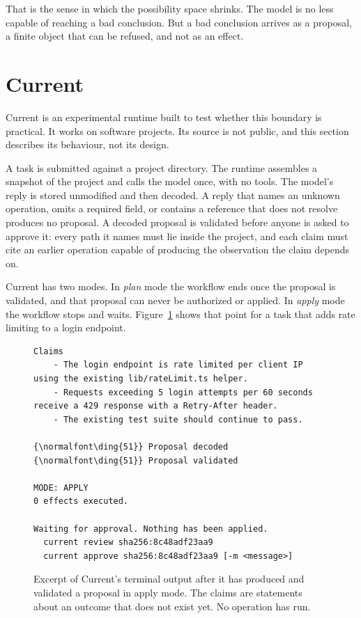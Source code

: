 \documentclass[10pt,letterpaper]{article}
\begin{document}
That is the sense in which the possibility space shrinks. The model is no less capable of
reaching a bad conclusion. But a bad conclusion arrives as a proposal, a finite object that
can be refused, and not as an effect.


\section{Current}

Current is an experimental runtime built to test whether this boundary is practical. It works
on software projects. Its source is not public, and this section describes its behaviour, not
its design.

A task is submitted against a project directory. The runtime assembles a snapshot of the
project and calls the model once, with no tools. The model's reply is stored unmodified and
then decoded. A reply that names an unknown operation, omits a required field, or contains a
reference that does not resolve produces no proposal. A decoded proposal is validated before
anyone is asked to approve it: every path it names must lie inside the project, and each claim
must cite an earlier operation capable of producing the observation the claim depends on.

Current has two modes. In \emph{plan} mode the workflow ends once the proposal is validated,
and that proposal can never be authorized or applied. In \emph{apply} mode the workflow stops
and waits. Figure~\ref{fig:terminal} shows that point for a task that adds rate limiting to a
login endpoint.

\begin{figure}[!ht]
\begin{terminal}
\begin{Verbatim}[commandchars=\\\{\},formatcom=\fontencoding{OT1}\fontfamily{cmtt}\fontsize{7.15}{9.7}\selectfont]
  Claims
    - The login endpoint is rate limited per client IP using the existing lib/rateLimit.ts helper.
    - Requests exceeding 5 login attempts per 60 seconds receive a 429 response with a Retry-After header.
    - The existing test suite should continue to pass.

{\normalfont\ding{51}} Proposal decoded
{\normalfont\ding{51}} Proposal validated

MODE: APPLY
0 effects executed.

Waiting for approval. Nothing has been applied.
  current review sha256:8c48adf23aa9
  current approve sha256:8c48adf23aa9 [-m <message>]
\end{Verbatim}
\end{terminal}
\caption{Excerpt of Current's terminal output after it has produced and validated a proposal
in apply mode. The claims are statements about an outcome that does not exist yet. No
operation has run.}
\label{fig:terminal}
\end{figure}
\end{document}

